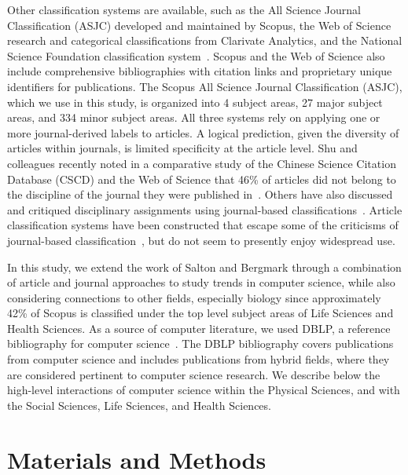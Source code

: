 Other classification systems are available, such as the All Science Journal Classification (ASJC) developed and maintained by Scopus, the Web of Science research and categorical classifications from Clarivate Analytics, and the National Science Foundation classification system~\cite{nsf_classification,scopus_ref,wos_ref}. Scopus and the Web of Science also include comprehensive bibliographies with citation links and proprietary unique identifiers for publications. The Scopus All Science Journal Classification (ASJC), which we use in this study, is organized  into 4 subject areas, 27 major subject areas, and 334 minor subject areas. All three systems rely on applying one or more journal-derived labels to articles.  
A logical prediction, given the diversity of articles within journals, is limited specificity at the article level. 
Shu and colleagues recently noted in a comparative study of the Chinese Science Citation Database (CSCD)  and the Web of Science that 46\% of articles did not belong to the discipline of the journal they were published in~\cite{shu_comparing_2019}. 
Others have also discussed and critiqued disciplinary assignments using journal-based classifications~\cite{wang_large-scale_2016,perianes-rodriguez_comparison_2017}. 
Article classification systems have been constructed that escape some of the criticisms of journal-based classification~\cite{traag_louvain_2019,boyack_classification_2014,waltman_new_2012}, but do not seem to presently enjoy widespread use. 
 
In this study, we extend the work of Salton and Bergmark through a combination of article and journal approaches to study trends in computer science, while also considering connections to other fields, especially biology since approximately 42\% of Scopus is classified under the top level subject areas of Life Sciences and Health Sciences. As a source of computer  literature, we used DBLP, a reference bibliography for computer science~\cite{dblp_ref}. The DBLP bibliography covers publications from computer science and includes publications from hybrid fields, where they are considered pertinent to computer science research. We describe below the high-level interactions of computer science within the Physical Sciences, and with the Social Sciences, Life Sciences, and Health Sciences. 

\section{Materials and Methods}
\label{sec:methods}

